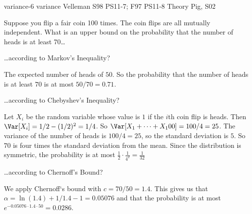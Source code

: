         {variance-6}             %
        {variance}               %
        {Velleman}               %
        {S98 PS11-7; F97 PS11-8} %
        {Theory Pig, S02}        %

\begin{problem}
Suppose you flip a fair coin 100 times.  The coin flips are all
mutually independent.  What is an upper bound on the probability that
the number of heads is at least 70\ldots
\begin{problemparts}

\problempart
\dots according to Markov's Inequality?

\begin{solution}
The expected number of heads of $50$.  So the probability that the
number of heads is at least $70$ is at most $50/70 = 0.71$.
\end{solution}

\problempart
\dots according to Chebyshev's Inequality?

\begin{solution}
Let $X_i$ be the random variable whose value is $1$ if the $i$th coin
flip is heads.  Then $\Var[X_i] = 1/2 - (1/2)^2 = 1/4$.  So $\Var[X_1
+ \cdots + X_100] = 100/4 = 25$.  The variance of the number of heads
is $100/4 = 25$, so the standard deviation is $5$.  So $70$ is four
times the standard deviation from the mean.  Since the distribution is
symmetric, the probability is at most $\frac{1}{2} \cdot \frac{1}{4^2}
= \frac{1}{32}$
\end{solution}

\problempart
\dots according to Chernoff's Bound?

\begin{solution}

We apply Chernoff`s bound with $c = 70/50 = 1.4$.  This gives us that
$\alpha = \ln(1.4) + 1/1.4 - 1 = 0.05076$ and that the probability is
at most $e^{-0.05076 \cdot 1.4 \cdot 50} = 0.0286$.

\end{solution}

\end{problemparts}

\end{problem}

\endinput
